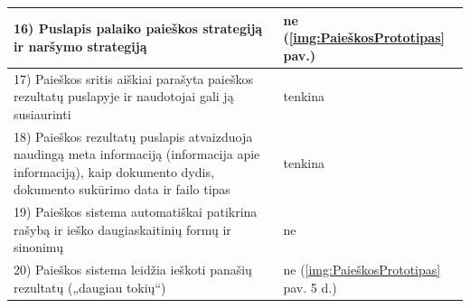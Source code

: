\documentclass{VUMIFPSbakalaurinis}
\begin{document}
\begin{center}
\begin{tabular}{ |p{13cm}|p{}| }
	16) Puslapis palaiko paieškos strategiją ir naršymo strategiją & ne (\ref{img:PaieškosPrototipas} pav.) \\ \hline
	17) Paieškos sritis aiškiai parašyta paieškos rezultatų puslapyje ir naudotojai gali ją susiaurinti & tenkina \\ \hline
	18) Paieškos rezultatų puslapis atvaizduoja naudingą meta informaciją (informacija apie informaciją), kaip dokumento dydis, dokumento sukūrimo data ir failo tipas & tenkina \\ \hline
	19) Paieškos sistema automatiškai patikrina rašybą ir ieško daugiaskaitinių formų ir sinonimų & ne \\ \hline
	20) Paieškos sistema leidžia ieškoti panašių rezultatų („daugiau tokių“) & ne (\ref{img:PaieškosPrototipas} pav. 5 d.) \\ \hline
\end{tabular}
\label{PaieškosLentelėPrad}
\end{center}
\pagebreak
\end{document}
